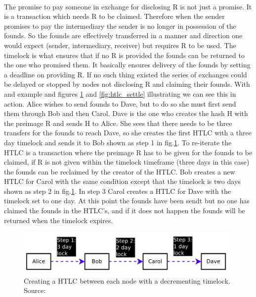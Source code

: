 \documentclass[informationsecurity]{gucmasterproject}
\begin{document}
\paragraph{}
The promise to pay someone in exchange for disclosing R is not just a promise. It is a transaction which needs R to be claimed. Therefore when the sender promises to pay the intermediary the sender is no longer in possession of the founds. So the founds are effectively transferred in a manner and direction one would expect (sender, intermediary, receiver) but requires R to be used. The timelock is what ensures that if no R is provided the founds can be returned to the one who promised them. It basically ensures delivery of the founds by setting a deadline on providing R. If no such thing existed the series of exchanges could be delayed or stopped by nodes not disclosing R and claiming their founds.
With and example and figures \ref{fig:htlc_promise} and \ref{fig:htlc_settle} illustrating we can see this in action.
Alice wishes to send founds to Dave, but to do so she must first send them through Bob and then Carol. Dave is the one who creates the hash H with the preimage R and sends H to Alice. She sees that there needs to be three transfers for the founds to reach Dave, so she creates the first HTLC with a three day timelock and sends it to Bob shown as step 1 in fig.\ref{fig:htlc_promise}. To re-iterate the HTLC is a transaction where the preimage R has to be given for the founds to be claimed, if R is not given within the timelock timeframe (three days in this case) the founds can be reclaimed by the creator of the HTLC. Bob creates a new HTLC for Carol with the same condition except that the timelock is two days shown as step 2 in fig.\ref{fig:htlc_promise}. In step 3 Carol creates a HTLC for Dave with the timelock set to one day. At this point the founds have been sendt but no one has claimed the founds in the HTLC's, and if it does not happen the founds will be returned when the timelock expires.

\begin{figure}[h]
    \centering
    \includegraphics[width=11cm]{htlc_promise.png}
    \caption{ Creating a HTLC between each node with a decrementing timelock. Source: \cite{poon2015bitcoin}}
    \label{fig:htlc_promise}
\end{figure}
\end{document}
